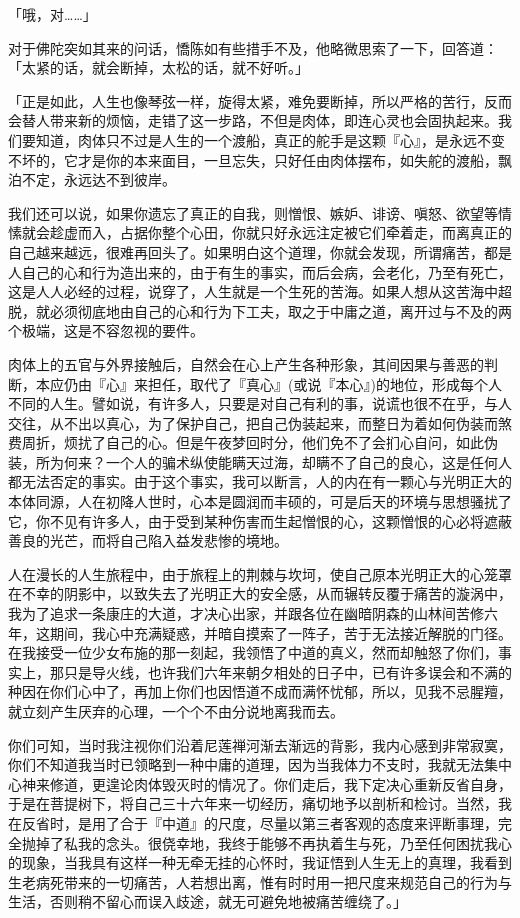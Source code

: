 \documentclass[12pt,twoside,openany]{book}
\begin{document}
「哦，对……」

对于佛陀突如其来的问话，憍陈如有些措手不及，他略微思索了一下，回答道：「太紧的话，就会断掉，太松的话，就不好听。」

「正是如此，人生也像琴弦一样，旋得太紧，难免要断掉，所以严格的苦行，反而会替人带来新的烦恼，走错了这一步路，不但是肉体，即连心灵也会固执起来。我们要知道，肉体只不过是人生的一个渡船，真正的舵手是这颗『心』，是永远不变不坏的，它才是你的本来面目，一旦忘失，只好任由肉体摆布，如失舵的渡船，飘泊不定，永远达不到彼岸。

我们还可以说，如果你遗忘了真正的自我，则憎恨、嫉妒、诽谤、嗔怒、欲望等情愫就会趁虚而入，占据你整个心田，你就只好永远注定被它们牵着走，而离真正的自己越来越远，很难再回头了。如果明白这个道理，你就会发现，所谓痛苦，都是人自己的心和行为造出来的，由于有生的事实，而后会病，会老化，乃至有死亡，这是人人必经的过程，说穿了，人生就是一个生死的苦海。如果人想从这苦海中超脱，就必须彻底地由自己的心和行为下工夫，取之于中庸之道，离开过与不及的两个极端，这是不容忽视的要件。

肉体上的五官与外界接触后，自然会在心上产生各种形象，其间因果与善恶的判断，本应仍由『心』来担任，取代了『真心』(或说『本心』)的地位，形成每个人不同的人生。譬如说，有许多人，只要是对自己有利的事，说谎也很不在乎，与人交往，从不出以真心，为了保护自己，把自己伪装起来，而整日为着如何伪装而煞费周折，烦扰了自己的心。但是午夜梦回时分，他们免不了会扪心自问，如此伪装，所为何来？一个人的骗术纵使能瞒天过海，却瞒不了自己的良心，这是任何人都无法否定的事实。由于这个事实，我可以断言，人的内在有一颗心与光明正大的本体同源，人在初降人世时，心本是圆润而丰硕的，可是后天的环境与思想骚扰了它，你不见有许多人，由于受到某种伤害而生起憎恨的心，这颗憎恨的心必将遮蔽善良的光芒，而将自己陷入益发悲惨的境地。

人在漫长的人生旅程中，由于旅程上的荆棘与坎坷，使自己原本光明正大的心笼罩在不幸的阴影中，以致失去了光明正大的安全感，从而辗转反覆于痛苦的漩涡中，我为了追求一条康庄的大道，才决心出家，并跟各位在幽暗阴森的山林间苦修六年，这期间，我心中充满疑惑，并暗自摸索了一阵子，苦于无法接近解脱的门径。在我接受一位少女布施的那一刻起，我领悟了中道的真义，然而却触怒了你们，事实上，那只是导火线，也许我们六年来朝夕相处的日子中，已有许多误会和不满的种因在你们心中了，再加上你们也因悟道不成而满怀忧郁，所以，见我不忌腥羶，就立刻产生厌弃的心理，一个个不由分说地离我而去。

你们可知，当时我注视你们沿着尼莲禅河渐去渐远的背影，我内心感到非常寂寞，你们不知道我当时已领略到一种中庸的道理，因为当我体力不支时，我就无法集中心神来修道，更遑论肉体毁灭时的情况了。你们走后，我下定决心重新反省自身，于是在菩提树下，将自己三十六年来一切经历，痛切地予以剖析和检讨。当然，我在反省时，是用了合于『中道』的尺度，尽量以第三者客观的态度来评断事理，完全抛掉了私我的念头。很侥幸地，我终于能够不再执着生与死，乃至任何困扰我心的现象，当我具有这样一种无牵无挂的心怀时，我证悟到人生无上的真理，我看到生老病死带来的一切痛苦，人若想出离，惟有时时用一把尺度来规范自己的行为与生活，否则稍不留心而误入歧途，就无可避免地被痛苦缠绕了。」
\end{document}

